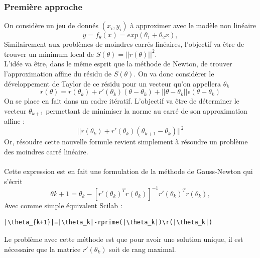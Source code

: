       \subsubsection{Première approche}
      On considère un jeu de donnés $(x_i,y_i)$ à approximer avec le modèle non linéaire 
      $$y=f_{\theta}(x)=exp(\theta_1 + \theta_2x),$$
      Similairement aux problèmes de moindres carrés linéaires, l'objectif va être de trouver un minimum local de $S(\theta) = ||r(\theta)||^2$.\\
      L'idée va être, dans le même esprit que la méthode de Newton, de trouver l'approximation affine du résidu de $S(\theta)$. On va donc considérer le développement de Taylor de ce résidu pour un vecteur qu'on appellera $\theta_k$
      $$r(\theta) = r(\theta_k)+r'(\theta_k)(\theta-\theta_k)+||\theta-\theta_k||\epsilon(\theta-\theta_k)$$
      On se place en fait dans un cadre itératif. L'objectif va être de déterminer le vecteur $\theta_{k+1}$ permettant de minimiser la norme au carré de son approximation affine :
      $$||r(\theta_k)+r'(\theta_k)(\theta_{k+1}-\theta_k)||^2$$
      Or, résoudre cette nouvelle formule revient simplement à résoudre un problème des moindres carré linéaire.\\
      \\Cette expression est en fait une formulation de la méthode de Gauss-Newton qui s'écrit 
      $$\theta{k+1}=\theta_k-[r'(\theta_k)^Tr(\theta_k)]^{-1}r'(\theta_k)^Tr(\theta_k),$$
      Avec comme simple équivalent Scilab :
      \begin{center}
          \begin{verbatim}
|\theta_{k+1}|=|\theta_k|-rprime(|\theta_k|)\r(|\theta_k|)
          \end{verbatim}
                \label{lst:code_11}
         \end{center}
         Le problème avec cette méthode est que pour avoir une solution unique, il est nécessaire que la matrice $r'(\theta_k)$ soit de rang maximal.
